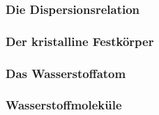 \documentclass[../main.tex]{subfiles}
\begin{document}
        \subsubsection*{Die Dispersionsrelation}


        \subsubsection{Der kristalline Festkörper}


        \subsubsection{Das Wasserstoffatom}


        \subsubsection*{Wasserstoffmoleküle}

    
\end{document}
